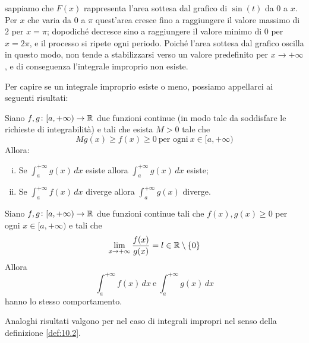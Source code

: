 \begin{example}
\begin{center}
        \end{center}
        sappiamo che $F(x)$ rappresenta l'area sottesa dal grafico di $\sin(t)$ da $0$ a $x$. Per $x$ che varia da 0 a $\pi$ quest'area cresce fino a raggiungere il valore massimo di $2$ per $x=\pi$; dopodiché decresce sino a raggiungere il valore minimo di $0$ per $x=2\pi$, e il processo si ripete ogni periodo. Poiché l'area sottesa dal grafico oscilla in questo modo, non tende a stabilizzarsi verso un valore predefinito per $x\to +\infty$, e di conseguenza l'integrale improprio non esiste.
\end{example}
Per capire se un integrale improprio esiste o meno, possiamo appellarci ai seguenti risultati:
\begin{theorem}
    \label{th:10.1}
    Siano $f, g\colon[a,+\infty)\to \amsbb{R}$ due funzioni continue (in modo tale da soddisfare le richieste di integrabilità) e tali che esista $M>0$ tale che
    \[
    Mg(x)\ge f(x)\ge 0 \ \text{per ogni} \ x\in[a,+\infty)
    \]
    Allora:
    \begin{enumerate}[(i)]
        \item Se $\int_a^{+\infty}g(x)\, dx$ esiste allora $\int_a^{+\infty}g(x)\, dx$ esiste;
        \item Se $\int_a^{+\infty}f(x)\, dx$ diverge allora $\int_a^{+\infty}g(x)$ diverge.
    \end{enumerate}
\end{theorem}
\begin{theorem}
    \label{th:10.2}
    Siano $f,g\colon[a,+\infty)\to \amsbb{R}$ due funzioni continue tali che $f(x), g(x)\ge 0$ per ogni $x\in[a,+\infty)$ e tali che
    \[
    \lim_{x\to+\infty} \frac{f(x)}{g(x)} = l\in\amsbb{R}\setminus\{0\}
    \]
    Allora
    \[
    \int_a^{+\infty}f(x)\, dx \ \text{e} \ \int_a^{+\infty}g(x)\, dx
    \]
    hanno lo stesso comportamento.
\end{theorem}
Analoghi risultati valgono per nel caso di integrali impropri nel senso della definizione \ref{def:10.2}.
